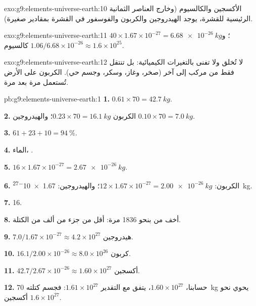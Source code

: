\begin{solution}{exo:g9:elements-universe-earth:10}
الأكسجين والكالسيوم (وخارج العناصر الثمانية الرئيسية للقشرة، يوجد الهيدروجين
والكربون والفوسفور في القشرة بمقادير
صغيرة).
\end{solution}

\begin{solution}{exo:g9:elements-universe-earth:11}
$40 \times 1.67 \times 10^{-27} = \qty{6.68e-26}{kg}$؛
و$1.06 / 6.68 \times 10^{-26} \approx 1.6 \times 10^{25}$  كالسيوم.
\end{solution}

\begin{solution}{exo:g9:elements-universe-earth:12}
 لا تُخلق ولا تفنى بالتغيرات الكيميائية: بل تنتقل فقط من مركب إلى آخر
(صخر، وغاز، وسكر، وجسم حي).  الكربون على الأرض تُستعمل مرة بعد
مرة.
\end{solution}

\begin{solution}{pb:g9:elements-universe-earth:1}
\textbf{1.} $0.61 \times 70 = \qty{42.7}{kg}$.

\textbf{2.} الكربون $0.23 \times 70 = \qty{16.1}{kg}$؛ والهيدروجين
$0.10 \times 70 = \qty{7.0}{kg}$.

\textbf{3.} $61 + 23 + 10 = \qty{94}{\percent}$.

\textbf{4.} الماء، .

\textbf{5.} $16 \times 1.67 \times 10^{-27} = \qty{2.67e-26}{kg}$.

\textbf{6.} الكربون: $12 \times 1.67 \times 10^{-27} = \qty{2.00e-26}{kg}$؛
والهيدروجين: \qty{1.67e-27}{kg}.

\textbf{7.} 16.

\textbf{8.}  أخف من  بنحو 1836 مرة:  أقل من جزء
من ألف من الكتلة.

\textbf{9.} $7.0 / 1.67 \times 10^{-27} \approx 4.2 \times 10^{27}$
 هيدروجين.

\textbf{10.} $16.1 / 2.00 \times 10^{-26} \approx 8.0 \times 10^{26}$
 كربون.

\textbf{11.} $42.7 / 2.67 \times 10^{-26} \approx 1.60 \times 10^{27}$
 أكسجين.

\textbf{12.} حسابنا، $1.60 \times 10^{27}$، يتفق مع التقدير
$1.61 \times 10^{27}$: فجسم كتلته \qty{70}{kg} يحوي نحو $1.6 \times
10^{27}$  أكسجين.
\end{solution}
